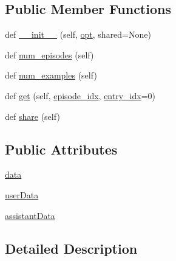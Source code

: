 \subsection*{Public Member Functions}
\begin{DoxyCompactItemize}
\item 
def \hyperlink{classparlai_1_1tasks_1_1ccpe_1_1agents_1_1CCPEAllTeacher_a7740c7de97e893e02c37bd64eccc3876}{\+\_\+\+\_\+init\+\_\+\+\_\+} (self, \hyperlink{classparlai_1_1core_1_1agents_1_1Teacher_a3ce6243860ce978a897922863ed32fa4}{opt}, shared=None)
\item 
def \hyperlink{classparlai_1_1tasks_1_1ccpe_1_1agents_1_1CCPEAllTeacher_a0f9ed996020d75cb7e204f72465f46d6}{num\+\_\+episodes} (self)
\item 
def \hyperlink{classparlai_1_1tasks_1_1ccpe_1_1agents_1_1CCPEAllTeacher_aa0cd16c6ebf2fa6bc0c8ad2e449445de}{num\+\_\+examples} (self)
\item 
def \hyperlink{classparlai_1_1tasks_1_1ccpe_1_1agents_1_1CCPEAllTeacher_aca16523f7aa61db6fc1c3fa561334521}{get} (self, \hyperlink{classparlai_1_1core_1_1teachers_1_1FixedDialogTeacher_afd4ebab8063eb42d182d30a1a41f133e}{episode\+\_\+idx}, \hyperlink{classparlai_1_1core_1_1teachers_1_1FixedDialogTeacher_ae3201b15f3c3b46a2f3511bad9b43e7d}{entry\+\_\+idx}=0)
\item 
def \hyperlink{classparlai_1_1tasks_1_1ccpe_1_1agents_1_1CCPEAllTeacher_ab1b9d65d88c950391175472d72694f80}{share} (self)
\end{DoxyCompactItemize}
\subsection*{Public Attributes}
\begin{DoxyCompactItemize}
\item 
\hyperlink{classparlai_1_1tasks_1_1ccpe_1_1agents_1_1CCPEAllTeacher_a47ccafd4c6309239c2bf3adede15324b}{data}
\item 
\hyperlink{classparlai_1_1tasks_1_1ccpe_1_1agents_1_1CCPEAllTeacher_ac05613e2339436bf69b6319a197a6ce5}{user\+Data}
\item 
\hyperlink{classparlai_1_1tasks_1_1ccpe_1_1agents_1_1CCPEAllTeacher_a87116ac748a76cceda5a74869e330a1e}{assistant\+Data}
\end{DoxyCompactItemize}


\subsection{Detailed Description}


